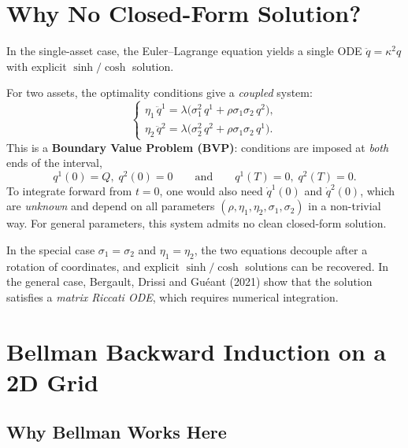 \documentclass[12pt, a4paper]{article}
\newcommand{\kap}{\kappa}
\begin{document}
\section{Why No Closed-Form Solution?}

In the single-asset case, the Euler--Lagrange equation yields a single ODE
$\ddot{q} = \kap^2 q$ with explicit $\sinh/\cosh$ solution.

For two assets, the optimality conditions give a \emph{coupled} system:
\[
  \begin{cases}
    \eta_1\,\ddot{q}^1 = \lambda\bigl(\sigma_1^2\,q^1 + \rho\sigma_1\sigma_2\,q^2\bigr), \\[4pt]
    \eta_2\,\ddot{q}^2 = \lambda\bigl(\sigma_2^2\,q^2 + \rho\sigma_1\sigma_2\,q^1\bigr).
  \end{cases}
\]
This is a \textbf{Boundary Value Problem (BVP)}: conditions are imposed at
\emph{both} ends of the interval,
\[
  q^1(0) = Q,\; q^2(0) = 0 \qquad \text{and} \qquad q^1(T) = 0,\; q^2(T) = 0.
\]
To integrate forward from $t=0$, one would also need $\dot{q}^1(0)$ and
$\dot{q}^2(0)$, which are \emph{unknown} and depend on all parameters
$(\rho, \eta_1, \eta_2, \sigma_1, \sigma_2)$ in a non-trivial way.
For general parameters, this system admits no clean closed-form solution.

\begin{keybox}
  In the special case $\sigma_1 = \sigma_2$ and $\eta_1 = \eta_2$, the two
  equations decouple after a rotation of coordinates, and explicit
  $\sinh/\cosh$ solutions can be recovered. In the general case,
  Bergault, Drissi and Gu\'eant (2021) show that the solution satisfies a
  \emph{matrix Riccati ODE}, which requires numerical integration.
\end{keybox}

\section{Bellman Backward Induction on a 2D Grid}
\label{sec:bellman}

\subsection{Why Bellman Works Here}
\end{document}
